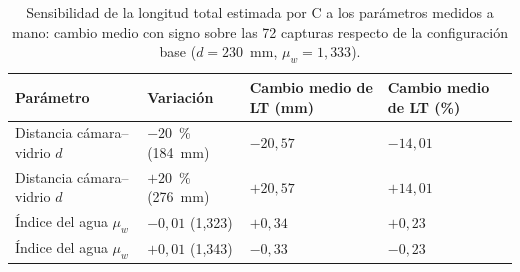 
\begin{table}[htbp]
\centering\footnotesize
\caption{Sensibilidad de la longitud total estimada por C a los parámetros medidos a mano: cambio medio con signo sobre las 72 capturas respecto de la configuración base ($d = 230$~mm, $\mu_w = 1{,}333$).}
\label{tab:sensibilidad}
\begin{tabular}{@{}p{4cm}p{2.6cm}p{2.8cm}p{2.8cm}@{}}
\toprule
Parámetro & Variación & Cambio medio de LT (mm) & Cambio medio de LT (\%) \\
\midrule
Distancia cámara--vidrio $d$ & $-20$~\% (184~mm) & $-20{,}57$ & $-14{,}01$ \\
Distancia cámara--vidrio $d$ & $+20$~\% (276~mm) & $+20{,}57$ & $+14{,}01$ \\
Índice del agua $\mu_w$ & $-0{,}01$ (1,323) & $+0{,}34$ & $+0{,}23$ \\
Índice del agua $\mu_w$ & $+0{,}01$ (1,343) & $-0{,}33$ & $-0{,}23$ \\
\bottomrule
\end{tabular}
\end{table}
